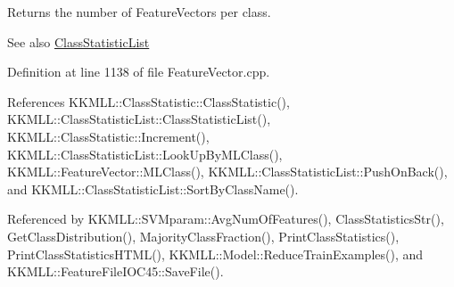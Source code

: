 Returns the number of Feature\+Vectors per class. 

\begin{DoxySeeAlso}{See also}
\hyperlink{class_k_k_m_l_l_1_1_class_statistic_list}{Class\+Statistic\+List} 
\end{DoxySeeAlso}


Definition at line 1138 of file Feature\+Vector.\+cpp.



References K\+K\+M\+L\+L\+::\+Class\+Statistic\+::\+Class\+Statistic(), K\+K\+M\+L\+L\+::\+Class\+Statistic\+List\+::\+Class\+Statistic\+List(), K\+K\+M\+L\+L\+::\+Class\+Statistic\+::\+Increment(), K\+K\+M\+L\+L\+::\+Class\+Statistic\+List\+::\+Look\+Up\+By\+M\+L\+Class(), K\+K\+M\+L\+L\+::\+Feature\+Vector\+::\+M\+L\+Class(), K\+K\+M\+L\+L\+::\+Class\+Statistic\+List\+::\+Push\+On\+Back(), and K\+K\+M\+L\+L\+::\+Class\+Statistic\+List\+::\+Sort\+By\+Class\+Name().



Referenced by K\+K\+M\+L\+L\+::\+S\+V\+Mparam\+::\+Avg\+Num\+Of\+Features(), Class\+Statistics\+Str(), Get\+Class\+Distribution(), Majority\+Class\+Fraction(), Print\+Class\+Statistics(), Print\+Class\+Statistics\+H\+T\+M\+L(), K\+K\+M\+L\+L\+::\+Model\+::\+Reduce\+Train\+Examples(), and K\+K\+M\+L\+L\+::\+Feature\+File\+I\+O\+C45\+::\+Save\+File().


